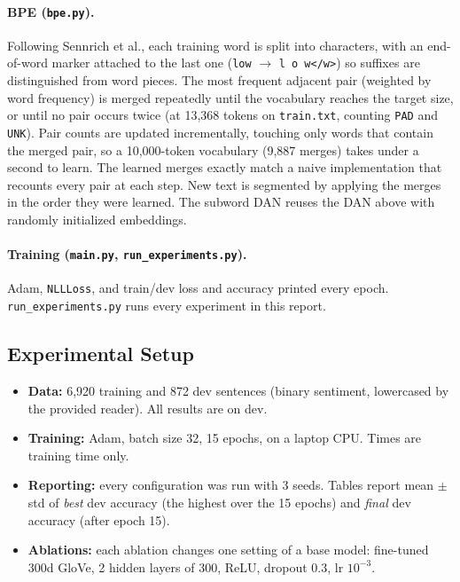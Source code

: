 \documentclass[10pt]{article}
\begin{document}
\paragraph{BPE (\texttt{bpe.py}).} Following Sennrich et al., each training word is split into characters, with an
end-of-word marker attached to the last one (\texttt{low} $\to$ \texttt{l o w</w>}) so suffixes are distinguished
from word pieces. The most frequent adjacent pair (weighted by word frequency) is merged repeatedly until the
vocabulary reaches the target size, or until no pair occurs twice (at 13,368 tokens on \texttt{train.txt},
counting \texttt{PAD} and \texttt{UNK}). Pair counts are updated incrementally, touching only words that contain the
merged pair, so a 10,000-token vocabulary (9,887 merges) takes under a second to learn. The learned merges exactly match a naive implementation that recounts every pair at each step. New text is
segmented by applying the merges in the order they were learned. The subword DAN reuses the DAN above with randomly
initialized embeddings.

\paragraph{Training (\texttt{main.py}, \texttt{run\_experiments.py}).} Adam, \texttt{NLLLoss}, and train/dev loss
and accuracy printed every epoch. \texttt{run\_experiments.py} runs every experiment in this report.

\subsection{Experimental Setup}

\begin{itemize}
  \item \textbf{Data:} 6,920 training and 872 dev sentences (binary sentiment, lowercased by the provided reader).
        All results are on dev.
  \item \textbf{Training:} Adam, batch size 32, 15 epochs, on a laptop CPU. Times are training time only.
  \item \textbf{Reporting:} every configuration was run with 3 seeds. Tables report mean $\pm$ std of \emph{best}
        dev accuracy (the highest over the 15 epochs) and \emph{final} dev accuracy (after epoch 15).
  \item \textbf{Ablations:} each ablation changes one setting of a base model: fine-tuned 300d GloVe, 2 hidden
        layers of 300, ReLU, dropout 0.3, lr $10^{-3}$.
\end{itemize}
\end{document}
